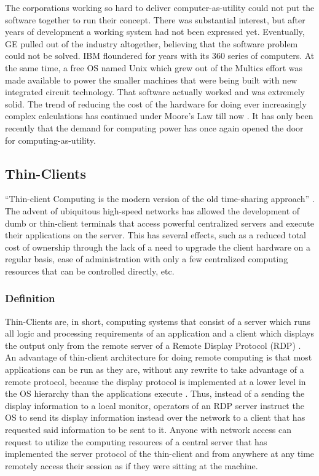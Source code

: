 \documentclass[12pt,oneside,letterpaper,titlepage]{article}
\begin{document}
The corporations working so hard to deliver computer-as-utility could not put
the software together to run their concept.  There was substantial interest, but
after years of development a working system had not been expressed yet.
Eventually, GE pulled out of the industry altogether, believing that the
software problem could not be solved.  IBM floundered for years with its 360
series of computers.  At the same time, a free OS named Unix which grew out of
the Multics effort was made available to power the smaller machines that were
being built with new integrated circuit technology.  That software actually
worked and was extremely solid.  The trend of reducing the cost of the hardware
for doing ever increasingly complex calculations has continued under Moore's Law
till now \citep{kelly2004}.  It has only been recently that the demand for
computing power has once again opened the door for computing-as-utility.

\subsection{Thin-Clients}

``Thin-client Computing is the modern version of the old time-sharing approach''
\citep{schmidt1999}.  The advent of ubiquitous high-speed networks has allowed
the development of dumb or thin-client terminals that access powerful
centralized servers and execute their applications on the server.  This has
several effects, such as a reduced total cost of ownership through the lack of a
need to upgrade the client hardware on a regular basis, ease of administration
with only a few centralized computing resources that can be controlled directly,
etc.

\subsubsection{Definition}

Thin-Clients are, in short, computing systems that consist of a server which
runs all logic and processing requirements of an application and a client which
displays the output only from the remote server of a Remote Display Protocol
(RDP) \citep{lai2002}.  An advantage of thin-client architecture for doing remote
computing is that most applications can be run as they are, without any rewrite
to take advantage of a remote protocol, because the display protocol is
implemented at a lower level in the OS hierarchy than the applications execute
\citep{schmidt1999}.  Thus, instead of a sending the display information to a local
monitor, operators of an RDP server instruct the OS to send its display
information instead over the network to a client that has requested said
information to be sent to it.  Anyone with network access can request to utilize
the computing resources of a central server that has implemented the server
protocol of the thin-client and from anywhere at any time remotely access their
session as if they were sitting at the machine.
\end{document}
